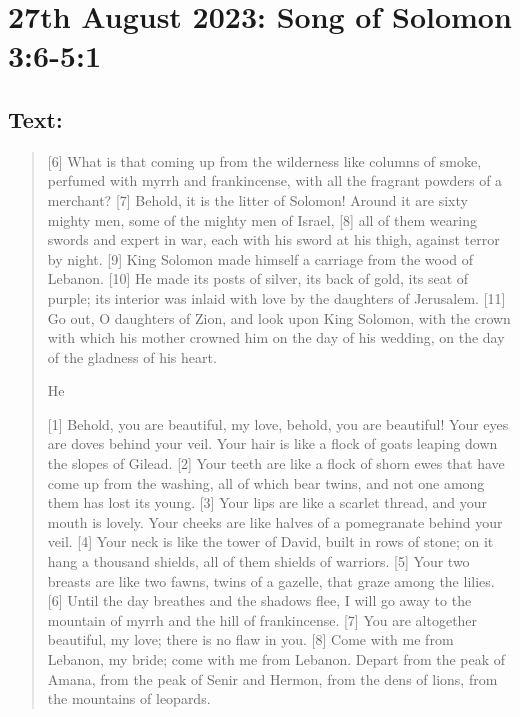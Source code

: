 \setcounter{figure}{0}

\section{27th August 2023: Song of Solomon 3:6-5:1}
\subsection*{Text: }
  \begin{quote}
    [6] What is that coming up from the wilderness
        like columns of smoke,
    perfumed with myrrh and frankincense,
        with all the fragrant powders of a merchant?
    [7] Behold, it is the litter of Solomon!
    Around it are sixty mighty men,
        some of the mighty men of Israel,
    [8] all of them wearing swords
        and expert in war,
    each with his sword at his thigh,
        against terror by night.
    [9] King Solomon made himself a carriage
        from the wood of Lebanon.
    [10] He made its posts of silver,
        its back of gold, its seat of purple;
    its interior was inlaid with love
        by the daughters of Jerusalem.
    [11] Go out, O daughters of Zion,
        and look upon King Solomon,
    with the crown with which his mother crowned him
        on the day of his wedding,
        on the day of the gladness of his heart.


        He

    [1] Behold, you are beautiful, my love,
        behold, you are beautiful!
    Your eyes are doves
        behind your veil.
    Your hair is like a flock of goats
        leaping down the slopes of Gilead.
    [2] Your teeth are like a flock of shorn ewes
        that have come up from the washing,
    all of which bear twins,
        and not one among them has lost its young.
    [3] Your lips are like a scarlet thread,
        and your mouth is lovely.
    Your cheeks are like halves of a pomegranate
        behind your veil.
    [4] Your neck is like the tower of David,
        built in rows of stone;
    on it hang a thousand shields,
        all of them shields of warriors.
    [5] Your two breasts are like two fawns,
        twins of a gazelle,
        that graze among the lilies.
    [6] Until the day breathes
        and the shadows flee,
    I will go away to the mountain of myrrh
        and the hill of frankincense.
    [7] You are altogether beautiful, my love;
        there is no flaw in you.
    [8] Come with me from Lebanon, my bride;
        come with me from Lebanon.
    Depart from the peak of Amana,
        from the peak of Senir and Hermon,
    from the dens of lions,
        from the mountains of leopards.



\end{quote}
